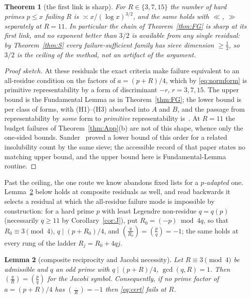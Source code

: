 \documentclass[11pt]{article}
\theoremstyle{plain}
\newtheorem{theorem}{Theorem}[section]
\newtheorem{lemma}[theorem]{Lemma}
\theoremstyle{remark}
\theoremstyle{plain}
\numberwithin{equation}{section}
\newcommand{\legendre}[2]{\genfrac{(}{)}{}{1}{#1}{#2}}
\begin{document}
\begin{theorem}[the first link is sharp]\label{thm:sharp}
For $R \in \{3, 7, 15\}$ the number of hard primes $p \le x$ failing
$R$ is $\asymp x/(\log x)^{3/2}$, and the same holds with $\ll$,
$\gg$ separately at $R = 11$. In particular the chain of
Theorem~\ref{thm:FG} is sharp at its first link, and no exponent
better than $3/2$ is available from any single residual: by
Theorem~\ref{thm:S} every failure-sufficient family has sieve
dimension $\ge \tfrac12$, so $3/2$ is the ceiling of the method, not
an artifact of the argument.
\end{theorem}

\begin{proof}[Proof sketch]
At these residuals the exact criteria make failure equivalent to an
all-residue condition on the factors of $a = (p+R)/4$, which by
\eqref{eq:normform} is primitive representability by a form of
discriminant $-r$, $r = 3, 7, 15$. The upper bound is the Fundamental
Lemma as in Theorem~\ref{thm:FG}; the lower bound is
\cite{IwaniecPhiA} per class of forms, with (H1)--(H3) absorbed into
$A$ and $B$, and the passage from representability by \emph{some} form
to \emph{primitive} representability is~\cite{FHRSS}. At $R = 11$ the
budget failures of Theorem~\ref{thm:App}(b) are not of this shape,
whence only the one-sided bounds. Sander~\cite{Sander94} proved a
lower bound of this order for a related insolubility count by the same
sieve; the accessible record of that paper states no matching upper
bound, and the upper bound here is Fundamental-Lemma routine.
\end{proof}

Past the ceiling, the one route we know abandons fixed lists for a
\emph{$p$-adapted} one. Lemma~\ref{lem:Jcomp} below holds at composite
residuals as well, and read backwards it selects a residual at which
the all-residue failure mode is impossible by construction: for a hard
prime $p$ with least Legendre non-residue $q = q(p)$ (necessarily
$q \ge 11$ by Corollary~\ref{cor:J}), put $R_0 = (-p) \bmod 4q$, so
that $R_0 \equiv 3 \pmod 4$, $q \mid (p+R_0)/4$, and
$\legendre{q}{R_0} = \legendre{p}{q} = -1$; the same holds at every
rung of the ladder $R_j = R_0 + 4qj$.

\begin{lemma}[composite reciprocity and Jacobi
necessity]\label{lem:Jcomp}
Let $R \equiv 3 \pmod 4$ be admissible and $q$ an odd prime with
$q \mid (p+R)/4$, $\gcd(q,R) = 1$. Then
$\legendre{q}{R} = \legendre{p}{q}$ for the Jacobi symbol.
Consequently, if no prime factor of $a = (p+R)/4$ has
$\legendre{\cdot}{R} = -1$ then \eqref{eq:cert} fails at $R$.
\end{lemma}
\end{document}
